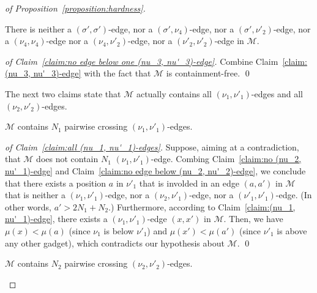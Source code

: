 \documentclass[a4paper]{llncs}
\begin{document}
\begin{proof}[of Proposition~\ref{proposition:hardness}]
  \begin{claim}
    \label{claim:no edge below one (nu_3, nu'_3)-edge}
    There is
    neither a $(\sigma', \sigma')$-edge,
    nor a $(\sigma', \nu_4)$-edge,
    nor a $(\sigma', \nu'_2)$-edge,
    nor a $(\nu_4, \nu_4)$-edge
    nor a $(\nu_4, \nu'_2)$-edge,
    nor a $(\nu'_2, \nu'_2)$-edge
    in $\mathcal{M}$.
  \end{claim}

  \begin{proof}[of Claim~\ref{claim:no edge below one (nu_3, nu'_3)-edge}]
    Combine Claim~\ref{claim:(nu_3, nu'_3)-edge} with the fact that
    $\mathcal{M}$ is containment-free.
    \qed
  \end{proof}

  The next two claims state that $\mathcal{M}$ actually contains
  all $(\nu_1, \nu'_1)$-edges and all $(\nu_2, \nu'_2)$-edges.

  \begin{claim}
    \label{claim:all (nu_1, nu'_1)-edges}
    $\mathcal{M}$ contains $N_1$ pairwise crossing $(\nu_1, \nu'_1)$-edges.
  \end{claim}

  \begin{proof}[of Claim~\ref{claim:all (nu_1, nu'_1)-edges}]
    Suppose, aiming at a contradiction, that
    $\mathcal{M}$ does not contain $N_1$ $(\nu_1, \nu'_1)$-edge.
    Combing Claim~\ref{claim:no (nu_2, nu'_1)-edge} and
    Claim~\ref{claim:no edge below (nu_2, nu'_2)-edge},
    we conclude that there exists a position $a$ in $\nu'_1$ that is
    involded in an edge $(a, a')$ in $\mathcal{M}$ that is
    neither a $(\nu_1, \nu'_1)$-edge,
    nor a $(\nu_2, \nu'_1)$-edge,
    nor a $(\nu'_1, \nu'_1)$-edge.
    (In other words, $a' > 2N_1 + N_2$.)
    Furthermore, according to Claim~\ref{claim:(nu_1, nu'_1)-edge},
    there exists a $(\nu_1, \nu'_1)$-edge $(x, x')$ in $\mathcal{M}$.
    Then, we have
    $\mu(x) < \mu(a)$ (since $\nu_1$ is below $\nu'_1$) and
    $\mu(x') < \mu(a')$ (since $\nu'_1$ is above any other gadget),
    which contradicts our hypothesis about $\mathcal{M}$.
    \qed
  \end{proof}

  \begin{claim}
    \label{claim:all (nu_2, nu'_2)-edges}
    $\mathcal{M}$ contains $N_2$ pairwise crossing $(\nu_2, \nu'_2)$-edges.
  \end{claim}


\end{proof}
\end{document}
